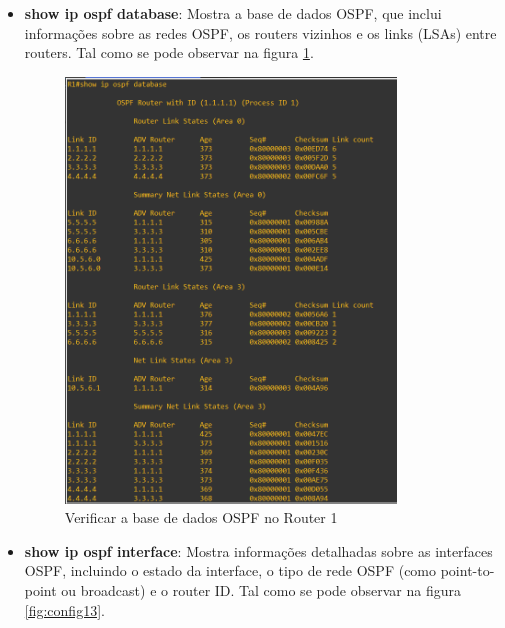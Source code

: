 \documentclass[11pt,english, openright, oneside]{book}
\begin{document}
\begin{itemize}
  \item \textbf{show ip ospf database}: Mostra a base de dados OSPF, que inclui informações sobre as redes OSPF, os routers vizinhos e os links (LSAs) entre routers. Tal como se pode observar na figura \ref{fig:config12}.
  \vspace{0.2cm}

  \begin{figure}[H]
    \centering
    \includegraphics[width=0.83\textwidth]{imagens/Tarefa2/9.ospf_database.png}
    \caption{Verificar a base de dados OSPF no Router 1}
    \label{fig:config12}
  \end{figure}
  \vspace{0.2cm}

  \item \textbf{show ip ospf interface}: Mostra informações detalhadas sobre as interfaces OSPF, incluindo o estado da interface, o tipo de rede OSPF (como point-to-point ou broadcast) e o router ID. Tal como se pode observar na figura \ref{fig:config13}.
  \vspace{0.2cm}


\end{itemize}
\end{document}
